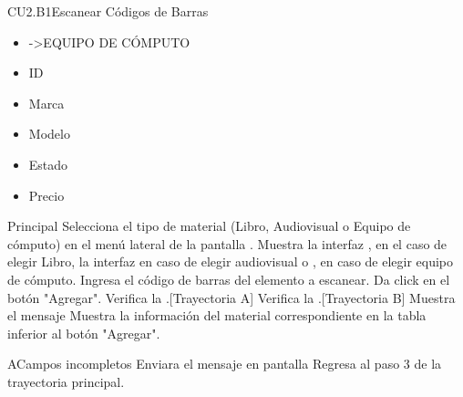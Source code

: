 \begin{UseCase}{CU2.B1}{Escanear Códigos de Barras}
{\begin{itemize}
				\item ->EQUIPO DE CÓMPUTO	
				\item ID
				\item Marca
				\item Modelo
				\item Estado
				\item Precio
		
			\end{itemize}				
		}

	\end{UseCase}
	\begin{UCtrayectoria}{Principal}
	  \UCpaso[\UCactor] Selecciona el tipo de material (Libro, Audiovisual o Equipo de cómputo) en el menú lateral de la pantalla .
	 \UCpaso[\UCsist]Muestra la interfaz , en el caso de elegir Libro, la interfaz  en caso de elegir audiovisual o , en caso de elegir equipo de cómputo.
	  \UCpaso[\UCactor] Ingresa el código de barras del elemento a escanear.
	  \UCpaso[\UCactor] Da click en el botón "Agregar".
	   \UCpaso[\UCsist] Verifica la  .[Trayectoria A]
	    \UCpaso[\UCsist] Verifica la .[Trayectoria B]
	    \UCpaso[\UCsist] Muestra el mensaje 
	    \UCpaso[\UCsist] Muestra la información del material correspondiente en la tabla inferior al botón "Agregar".
	\end{UCtrayectoria}

		\begin{UCtrayectoriaA}{A}{Campos incompletos}
			\UCpaso[\UCsist] Enviara el  mensaje en pantalla 
			\UCpaso[\UCsist] Regresa al paso 3 de la trayectoria principal.
		\end{UCtrayectoriaA}
		
